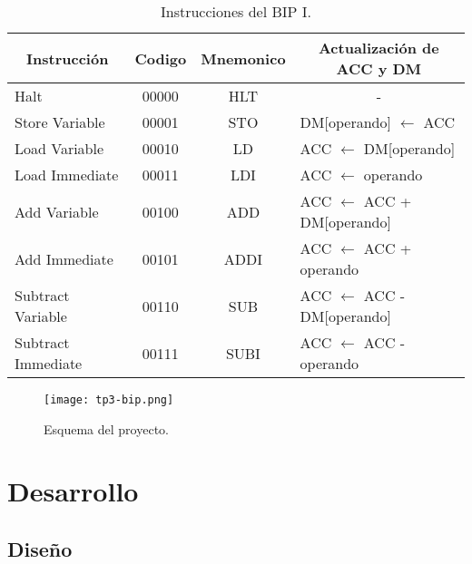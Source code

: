 \documentclass[12pt,a4paper]{article}
\begin{document}
\begin{table}[H]
\centering
\begin{tabular}{||l|c|c|l||}
\hline
\multicolumn{1}{||c|}{\textbf{Instrucción}} & \textbf{Codigo} & \textbf{Mnemonico} & \multicolumn{1}{c||}{\textbf{Actualización de ACC y DM}} \\ \hline
Halt                                       & 00000           & HLT                & \multicolumn{1}{c||}{-}                                       \\ \hline
Store Variable                             & 00001           & STO                & DM{[}operando{]} $\leftarrow$ ACC                            \\ \hline
Load Variable                              & 00010           & LD                 & ACC $\leftarrow$ DM{[}operando{]}                            \\ \hline
Load Immediate                             & 00011           & LDI                & ACC $\leftarrow$ operando                                    \\ \hline
Add Variable                               & 00100           & ADD                & ACC $\leftarrow$ ACC + DM{[}operando{]}                      \\ \hline
Add Immediate                              & 00101           & ADDI               & ACC $\leftarrow$ ACC + operando                              \\ \hline
Subtract Variable                          & 00110           & SUB                & ACC $\leftarrow$ ACC - DM{[}operando{]}                      \\ \hline
Subtract Immediate                         & 00111           & SUBI               & ACC $\leftarrow$ ACC - operando                              \\ \hline
\end{tabular}
\caption{Instrucciones del BIP I.}
\label{tab:bipi}
\end{table}

\begin{figure}[H]
\centering
\texttt{[image: tp3-bip.png]}
\caption{Esquema del proyecto.}
\label{fig:esq}
\end{figure}

\section{Desarrollo}
\label{sec:des}

\subsection{Diseño}
\label{subs:diseño}
\end{document}
